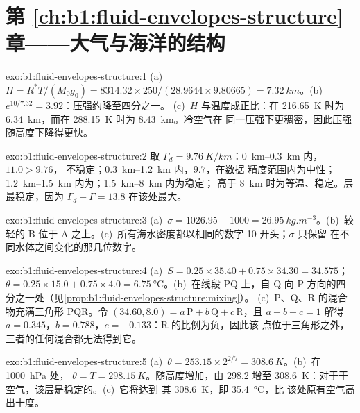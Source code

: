 \section*{第 \ref{ch:b1:fluid-envelopes-structure} 章——大气与海洋的结构}

\begin{solution}{exo:b1:fluid-envelopes-structure:1}
(a)~$H = R^*T/(M_0 g_0) = 8314.32 \times 250/(28.9644 \times 9.80665) =
\qty{7.32}{km}$。(b)~$e^{10/7.32} = 3.92$：压强约降至四分之一。
(c)~$H$ 与温度成正比：在 \qty{216.65}{K} 时为
\qty{6.34}{km}，而在 \qty{288.15}{K} 时为 \qty{8.43}{km}。冷空气在
同一压强下更稠密，因此压强随高度下降得更快。
\end{solution}

\begin{solution}{exo:b1:fluid-envelopes-structure:2}
取 $\Gamma_d = \qty{9.76}{K/km}$：\qtyrange{0}{0.3}{km} 内，$11.0 > 9.76$，
不稳定；\qtyrange{0.3}{1.2}{km} 内，$9.7$，在数据
精度范围内为中性；\qtyrange{1.2}{1.5}{km} 内为；\qtyrange{1.5}{8}{km} 内为稳定；
高于 \qty{8}{km} 时为等温、稳定。层最稳定，因为
$\Gamma_d - \Gamma = 13.8$ 在该处最大。
\end{solution}

\begin{solution}{exo:b1:fluid-envelopes-structure:3}
(a)~$\sigma = 1026.95 - 1000 = \qty{26.95}{kg.m^{-3}}$。(b)~较轻的 B 位于
A 之上。(c)~所有海水密度都以相同的数字 10 开头；$\sigma$ 只保留
在不同水体之间变化的那几位数字。
\end{solution}

\begin{solution}{exo:b1:fluid-envelopes-structure:4}
(a)~$S = 0.25 \times 35.40 + 0.75 \times 34.30 = 34.575$；$\theta = 0.25 \times
15.0 + 0.75 \times 4.0 = \qty{6.75}{\celsius}$。(b)~在线段 PQ 上，自 Q 向 P
方向的四分之一处（见\cref{prop:b1:fluid-envelopes-structure:mixing}）。
(c)~P、Q、R 的混合物充满三角形 PQR。令
$(34.60, 8.0) = a\,\mathrm P + b\,\mathrm Q + c\,\mathrm R$，且 $a + b + c = 1$
解得 $a = 0.345$，$b = 0.788$，$c = -0.133$：R 的比例为负，因此该
点位于三角形之外，三者的任何混合都无法得到它。
\end{solution}

\begin{solution}{exo:b1:fluid-envelopes-structure:5}
(a)~$\theta = 253.15 \times 2^{2/7} = \qty{308.6}{K}$。(b)~在 \qty{1000}{hPa} 处，
$\theta = T = \qty{298.15}{K}$。随高度增加，由
298.2 增至 \qty{308.6}{K}：对于干空气，该层是稳定的。(c)~它将达到
其 \qty{308.6}{K}，即 \qty{35.4}{\celsius}，比
该处原有空气高出十度。
\end{solution}

